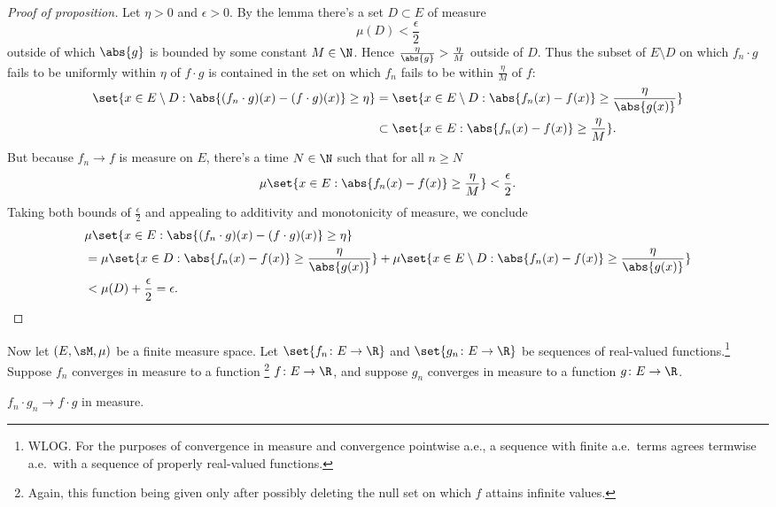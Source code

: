 \documentclass[onesided]{ccg-pset}
\begin{document}
\begin{enumerate}
\begin{proof}[Proof of proposition] 
Let $\eta > 0$ and $\epsilon > 0$. By the lemma there's a set $D\subset E$ of measure 
\begin{equation*}
    \mu(D) < \frac{\epsilon}{2}
\end{equation*}
outside of which $\abs{g}$ is bounded by some constant $M \in \N$. Hence $\frac{\eta}{\abs{g}} > \frac{\eta}{M}$ outside of $D$. Thus the subset of $E\setminus D$ on which $f_n\cdot g$ fails to be uniformly within $\eta$ of $f\cdot g$ is contained in the set on which $f_n$ fails to be within $\frac{\eta}{M}$ of $f$:
\begin{align*}
    \set{x \in E\setminus D : \abs{(f_n\cdot g)(x) - (f\cdot g)(x)} \ge \eta} &=
    \set{x \in E\setminus D : \abs{f_n(x) - f(x)} \ge \frac{\eta}{\abs{g(x)}}} \\
&\subset \set{x \in E : \abs{f_n(x) - f(x)} \ge \frac{\eta}{M}}.
\end{align*}
But because $f_n \to f$ is measure on $E$, there's a time $N \in \N$ such that for all $n \ge N$
\begin{equation*}
\mu\set{x \in E : \abs{f_n(x) - f(x)} \ge \frac{\eta}{M}} < \frac{\epsilon}{2}.
\end{equation*}
Taking both bounds of $\frac{\epsilon}{2}$ and appealing to additivity and monotonicity of measure, we conclude
\begin{align*}
    &\mu\set{x \in E: \abs{(f_n\cdot g)(x) - (f\cdot g)(x)} \ge \eta} \\
&= \mu\set{x \in D : \abs{f_n(x) - f(x)} \ge \frac{\eta}{\abs{g(x)}}} + \mu\set{x \in E\setminus D : \abs{f_n(x) - f(x)} \ge \frac{\eta}{\abs{g(x)}}}\\
&< \mu(D) + \frac{\epsilon}{2} = \epsilon.
\end{align*}
\end{proof}

Now let $(E, \sM, \mu)$ be a finite measure space. Let $\set{f_n \colon E \to \R}$ and $\set{g_n \colon E \to \R}$ be sequences of real-valued functions.\footnote{%
  WLOG. For the purposes of convergence in measure and convergence pointwise a.e., a sequence with finite a.e.~terms agrees termwise a.e.~with a sequence of properly real-valued functions.
      } 
Suppose $f_n$ converges in measure to a function%
      \footnote{
      Again, this function being given only after possibly deleting the null set on which $f$ attains infinite values.
      }
 $f \colon E \to \R$, and suppose $g_n$ converges in measure to a function $g \colon E \to \R$.
\begin{prop*}
$f_n \cdot g_n \to f \cdot g$ in measure.
\end{prop*}


\end{enumerate}
\end{document}
